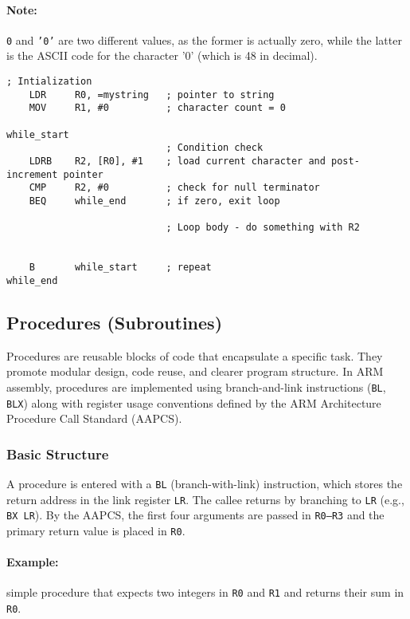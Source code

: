 \paragraph{Note:} \texttt{0} and \texttt{'0'} are two different values, as the former is actually zero, while the latter is the ASCII code for the character '0' (which is 48 in decimal).
\begin{lstlisting}[caption={While loop with string processing example}]
    ; Intialization
    LDR     R0, =mystring   ; pointer to string
    MOV     R1, #0          ; character count = 0

while_start
                            ; Condition check
    LDRB    R2, [R0], #1    ; load current character and post-increment pointer
    CMP     R2, #0          ; check for null terminator
    BEQ     while_end       ; if zero, exit loop
    
                            ; Loop body - do something with R2

    
    B       while_start     ; repeat
while_end
\end{lstlisting}

\subsection{Procedures (Subroutines)}

Procedures are reusable blocks of code that encapsulate a specific task. They promote modular design, code reuse, and clearer program structure.  
In ARM assembly, procedures are implemented using branch-and-link instructions (\texttt{BL}, \texttt{BLX}) along with register usage conventions defined by the ARM Architecture Procedure Call Standard (AAPCS).

\subsubsection{Basic Structure}
A procedure is entered with a \texttt{BL} (branch-with-link) instruction, which stores the return address in the link register \texttt{LR}. The callee returns by branching to \texttt{LR} (e.g., \texttt{BX LR}). By the AAPCS, the first four arguments are passed in \texttt{R0--R3} and the primary return value is placed in \texttt{R0}. 

\paragraph{Example:} simple procedure that expects two integers in \texttt{R0} and \texttt{R1} and returns their sum in \texttt{R0}.

